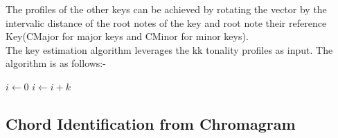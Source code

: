 \noindent The profiles of the other keys can be achieved by rotating the vector by the intervalic distance of the root notes of the key and root note their reference Key(CMajor for major keys and CMinor for minor keys). \\

\noindent The key estimation algorithm leverages the kk tonality profiles as input. The algorithm is as follows:-

\begin{algorithmic}
    \State $i\gets 0$
\Else
        \State $i\gets i+k$
    \EndIf
\EndIf
\end{algorithmic}

\subsection{Chord Identification from Chromagram}

